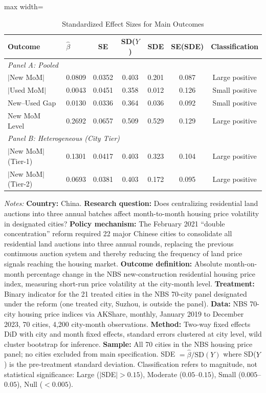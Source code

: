 \begin{table}[H]
\centering
\caption{Standardized Effect Sizes for Main Outcomes}
\label{tab:sde}
\begin{threeparttable}
\begin{adjustbox}{max width=\textwidth}
\begin{tabular}{llccccc}
\toprule
Outcome & $\hat{\beta}$ & SE & SD($Y$) & SDE & SE(SDE) & Classification \\
\midrule
\multicolumn{7}{l}{\textit{Panel A: Pooled}} \\
$|$New MoM$|$ & 0.0809 & 0.0352 & 0.403 & 0.201 & 0.087 & Large positive \\
$|$Used MoM$|$ & 0.0043 & 0.0451 & 0.358 & 0.012 & 0.126 & Small positive \\
New--Used Gap & 0.0130 & 0.0336 & 0.364 & 0.036 & 0.092 & Small positive \\
New MoM Level & 0.2692 & 0.0657 & 0.509 & 0.529 & 0.129 & Large positive \\
\midrule
\multicolumn{7}{l}{\textit{Panel B: Heterogeneous (City Tier)}} \\
$|$New MoM$|$ (Tier-1) & 0.1301 & 0.0417 & 0.403 & 0.323 & 0.104 & Large positive \\
$|$New MoM$|$ (Tier-2) & 0.0693 & 0.0381 & 0.403 & 0.172 & 0.095 & Large positive \\
\bottomrule
\end{tabular}
\end{adjustbox}
\begin{tablenotes}[flushleft]
\small
\item \textit{Notes:} \textbf{Country:} China. \textbf{Research question:} Does centralizing residential land auctions into three annual batches affect month-to-month housing price volatility in designated cities? \textbf{Policy mechanism:} The February 2021 ``double concentration'' reform required 22 major Chinese cities to consolidate all residential land auctions into three annual rounds, replacing the previous continuous auction system and thereby reducing the frequency of land price signals reaching the housing market. \textbf{Outcome definition:} Absolute month-on-month percentage change in the NBS new-construction residential housing price index, measuring short-run price volatility at the city-month level. \textbf{Treatment:} Binary indicator for the 21 treated cities in the NBS 70-city panel designated under the reform (one treated city, Suzhou, is outside the panel). \textbf{Data:} NBS 70-city housing price indices via AKShare, monthly, January 2019 to December 2023, 70 cities, 4,200 city-month observations. \textbf{Method:} Two-way fixed effects DiD with city and month fixed effects, standard errors clustered at city level, wild cluster bootstrap for inference. \textbf{Sample:} All 70 cities in the NBS housing price panel; no cities excluded from main specification. SDE $= \hat{\beta} / \text{SD}(Y)$ where SD($Y$) is the pre-treatment standard deviation. Classification refers to magnitude, not statistical significance: Large ($|$SDE$| > 0.15$), Moderate ($0.05$--$0.15$), Small ($0.005$--$0.05$), Null ($< 0.005$).
\end{tablenotes}
\end{threeparttable}
\end{table}

